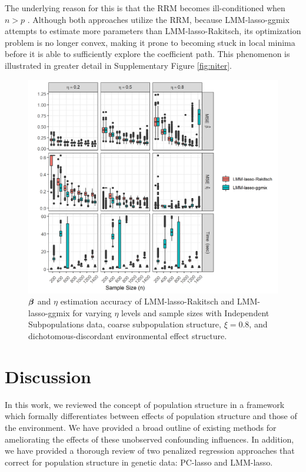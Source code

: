 The underlying reason for this is that the RRM becomes ill-conditioned when $n > p$ \citep{ledoit2004well}. Although both approaches utilize the RRM, because LMM-lasso-ggmix attempts to estimate more parameters than LMM-lasso-Rakitsch, its optimization problem is no longer convex, making it prone to becoming stuck in local minima before it is able to sufficiently explore the coefficient path. This phenomenon is illustrated in greater detail in Supplementary Figure \ref{fig:niter}.

\begin{figure}[H]
    \centering
    \includegraphics[width = \textwidth]{figures/eta_beta_hat.png}
     \caption{$\boldsymbol{\beta}{}$ and $\eta$ estimation accuracy of LMM-lasso-Rakitsch and LMM-lasso-ggmix for varying $\eta$ levels and sample sizes with Independent Subpopulations data, coarse subpopulation structure, $\xi = 0.8$, and dichotomous-discordant environmental effect structure.}
    \label{fig:eta_beta_mse}
\end{figure}

\section{Discussion} \label{sec:discussion}

In this work, we reviewed the concept of population structure in a framework which formally differentiates between effects of population structure and those of the environment. We have provided a broad outline of existing  methods for ameliorating the effects of these unobserved confounding influences. In addition, we have provided a thorough review of two penalized regression approaches that correct for population structure in genetic data: PC-lasso and LMM-lasso. 


